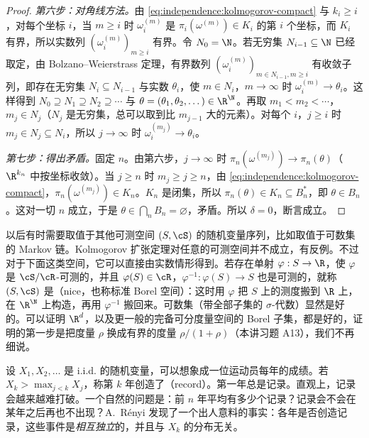 \begin{proof}
\emph{第六步：对角线方法。}由 \eqref{eq:independence:kolmogorov-compact} 与 $k_i\geqslant i$，对每个坐标 $i$，当 $m\geqslant i$ 时 $\omega^{(m)}_i$ 是 $\pi_i(\omega^{(m)})\in K_i$ 的第 $i$ 个坐标，而 $K_i$ 有界，所以实数列 $(\omega^{(m)}_i)_{m\geqslant i}$ 有界。令 $N_0=\N$。若无穷集 $N_{i-1}\subseteq\N$ 已经取定，由 Bolzano--Weierstrass 定理，有界数列 $(\omega^{(m)}_i)_{m\in N_{i-1},m\geqslant i}$ 有收敛子列，即存在无穷集 $N_i\subseteq N_{i-1}$ 与实数 $\theta_i$，使 $m\in N_i$，$m\to\infty$ 时 $\omega^{(m)}_i\to\theta_i$。这样得到 $N_0\supseteq N_1\supseteq N_2\supseteq\cdots$ 与 $\theta=(\theta_1,\theta_2,\dots)\in\R^\N$。再取 $m_1<m_2<\cdots$，$m_j\in N_j$（$N_j$ 是无穷集，总可以取到比 $m_{j-1}$ 大的元素）。对每个 $i$，$j\geqslant i$ 时 $m_j\in N_j\subseteq N_i$，所以 $j\to\infty$ 时 $\omega^{(m_j)}_i\to\theta_i$。

\emph{第七步：得出矛盾。}固定 $n$。由第六步，$j\to\infty$ 时 $\pi_n(\omega^{(m_j)})\to\pi_n(\theta)$（$\R^{k_n}$ 中按坐标收敛）。当 $j\geqslant n$ 时 $m_j\geqslant j\geqslant n$，由 \eqref{eq:independence:kolmogorov-compact}，$\pi_n(\omega^{(m_j)})\in K_n$。$K_n$ 是闭集，所以 $\pi_n(\theta)\in K_n\subseteq B_n^*$，即 $\theta\in B_n$。这对一切 $n$ 成立，于是 $\theta\in\bigcap_nB_n=\varnothing$，矛盾。所以 $\delta=0$，断言成立。
\end{proof}

\begin{remark}[取值于其他空间的序列]
以后有时需要取值于其他可测空间 $(S,\cS)$ 的随机变量序列，比如取值于可数集的 Markov 链。Kolmogorov 扩张定理对任意的可测空间并不成立，有反例。不过对于下面这类空间，它可以直接由实数情形得到。若存在单射 $\varphi:S\to\R$，使 $\varphi$ 是 $\cS/\cR$-可测的，并且 $\varphi(S)\in\cR$，$\varphi^{-1}:\varphi(S)\to S$ 也是可测的，就称 $(S,\cS)$ 是（nice，也称标准 Borel 空间）：这时用 $\varphi$ 把 $S$ 上的测度搬到 $\R$ 上，在 $\R^\N$ 上构造，再用 $\varphi^{-1}$ 搬回来。可数集（带全部子集的 $\sigma$-代数）显然是好的。可以证明 $\R^d$，以及更一般的完备可分度量空间的 Borel 子集，都是好的，证明的第一步是把度量 $\rho$ 换成有界的度量 $\rho/(1+\rho)$（本讲习题 A13），我们不再细说。
\end{remark}


设 $X_1,X_2,\dots$ 是 i.i.d. 的随机变量，可以想象成一位运动员每年的成绩。若 $X_k>\max_{j<k}X_j$，称第 $k$ 年创造了（record）。第一年总是记录。直观上，记录会越来越难打破。一个自然的问题是：前 $n$ 年平均有多少个记录？记录会不会在某年之后再也不出现？A.\ Rényi 发现了一个出人意料的事实：各年是否创造记录，这些事件是\emph{相互独立}的，并且与 $X_k$ 的分布无关。

